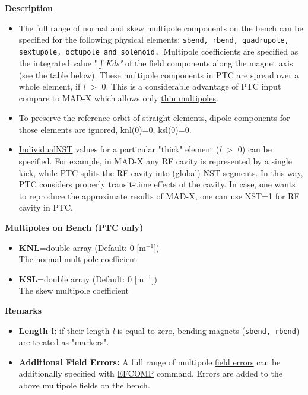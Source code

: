 {\bf Description} \\
\begin{itemize}
   \item The full range of  normal and skew multipole components on the
     bench can be  specified for the following physical elements:
     \texttt{sbend, rbend, quadrupole, sextupole,  octupole and
       solenoid. }Multipole coefficients are specified as the integrated
     value "$\int$\textit{Kds"}  of the field components along the
     magnet axis (see \hyperlink{Multipoles_on_Bench_(PTC_only)}{the
       table} below). These multipole components in PTC are spread over
     a whole element, if \textit{l }$>$ 0. This is a considerable
     advantage of PTC input compare  to MAD-X  which allows only
     \href{../Introduction/multipole.html}{ thin multipoles}. 

   \item  To preserve the reference orbit of straight elements, dipole
     components  for those elements are ignored, knl(0)=0, ksl(0)=0.
      
   \item  \href{individual}{Individual}\hyperlink{NST}{NST} values for
     a  particular "thick" element (\textit{l }$>$ 0) can be
     specified. For example,  in MAD-X any RF cavity is represented
     by a single kick, while  PTC splits the RF cavity into (global)
     NST segments. In this  way, PTC considers properly transit-time
     effects of the cavity.  In case, one wants to reproduce the
     approximate results of  MAD-X, one can use NST=1 for RF cavity
     in PTC. 
\end{itemize}

{\bf Multipoles on Bench  (PTC only)} \\ 
\begin{itemize}
  \item {\bf KNL}=double array (Default: 0   [m$^{-1}$]) \\
    The normal multipole coefficient 
  \item {\bf KSL}=double array (Default: 0   [m$^{-1}$]) \\
    The skew multipole coefficient 
\end{itemize}
        
{\bf Remarks} \\

\begin{itemize}
   \item {\bf Length l:} if their length \textit{l} is equal to zero,
     bending magnets (\texttt{sbend, rbend}) are treated as "markers". 
     
   \item {\bf Additional Field Errors:} A full range of multipole
     \href{../error/error_field.html}{ field errors} can be
     additionally specified with
     \href{../error/error_field.html#efcomp}{ EFCOMP} command. Errors
     are added to the above multipole fields on the bench. 
\end{itemize}

